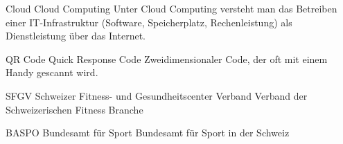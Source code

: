 {Cloud}
{Cloud Computing}
{
	Unter Cloud Computing versteht man das Betreiben einer IT-Infrastruktur (Software, Speicherplatz, Rechenleistung) als Dienstleistung über das Internet.
}

{QR Code}
{Quick Response Code}
{
	Zweidimensionaler Code, der oft mit einem Handy gescannt wird.
}

{SFGV}
{Schweizer Fitness- und Gesundheitscenter Verband}
{
	Verband der Schweizerischen Fitness Branche
}

{BASPO}
{Bundesamt für Sport}
{
	Bundesamt für Sport in der Schweiz
}



